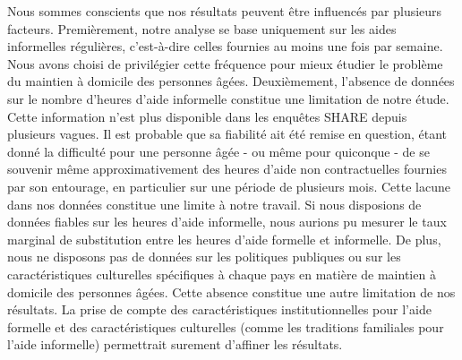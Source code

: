 \begin{Article}
\begin{refsection}[Bonnal]
Nous sommes conscients que nos résultats peuvent être influencés par plusieurs facteurs. Premièrement, notre analyse se base uniquement sur les aides informelles régulières, c'est-à-dire celles fournies au moins une fois par semaine. Nous avons choisi de privilégier cette fréquence pour mieux étudier le problème du maintien à domicile des personnes âgées. Deuxièmement, l'absence de données sur le nombre d'heures d'aide informelle constitue une limitation de notre étude. Cette information n'est plus disponible dans les enquêtes SHARE depuis plusieurs vagues. Il est probable que sa fiabilité ait été remise en question, étant donné la difficulté pour une personne âgée - ou même pour quiconque - de se souvenir même approximativement des heures d'aide non contractuelles fournies par son entourage, en particulier sur une période de plusieurs mois. Cette lacune dans nos données constitue une limite à notre travail. Si nous disposions de données fiables sur les heures d'aide informelle, nous aurions pu mesurer le taux marginal de substitution entre les heures d'aide formelle et informelle. De plus, nous ne disposons pas de données sur les politiques publiques ou sur les caractéristiques culturelles spécifiques à chaque pays en matière de maintien à domicile des personnes âgées. Cette absence constitue une autre limitation de nos résultats. La prise de compte des caractéristiques institutionnelles pour l’aide formelle et des caractéristiques culturelles (comme les traditions familiales pour l’aide informelle) permettrait surement d’affiner les résultats.


\end{refsection}
\end{Article}

